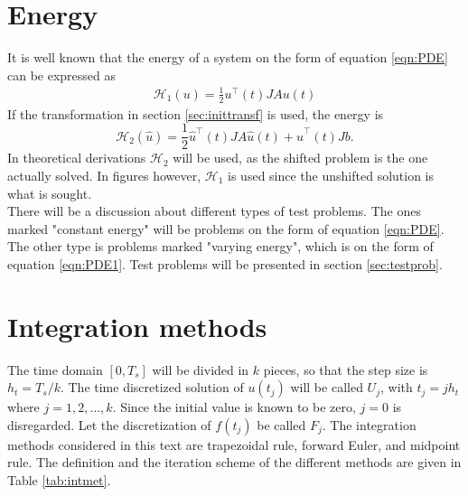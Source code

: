 \section{Energy}%
It is well known that the energy of a system on the form of equation \eqref{eqn:PDE} can be expressed as \cite{energy}
\begin{equation*}
\begin{aligned}
\mathcal{H}_1(u) = \frac{1}{2} u^\top (t) J A u(t)
\end{aligned}
\end{equation*}
\noindent If the transformation in section \ref{sec:inittransf} is used, the energy is 
\begin{equation}
\mathcal{H}_2 (\hat{u}) = \frac{1}{2} \hat{u}^\top (t)  J A \hat{u}(t) + \hat{u}^\top (t)  J b.
\label{eqn:energy2}
\end{equation}
\noindent In theoretical derivations $\mathcal{H}_2$ will be used, as the shifted problem is the one actually solved. In figures however, $\mathcal{H}_1$ is used since the unshifted solution is what is sought. \\

\noindent There will be a discussion about different types of test problems. The ones marked "constant energy" will be problems on the form of equation \eqref{eqn:PDE}. The other type is problems marked "varying energy", which is on the form of equation \eqref{eqn:PDE1}. Test problems will be presented in section \ref{sec:testprob}.

\section{Integration methods}%
\noindent The time domain $[0,T_s]$ will be divided in $k$ pieces, so that the step size is $h_t = T_s/k$. The time discretized solution of $u(t_j)$ will be called $U_j$, with $t_j = j h_t$ where $ j = 1,2,\dots,k $. Since the initial value is known to be zero, $j = 0$ is disregarded. Let the discretization of $f(t_j)$ be called $F_j$. The integration methods considered in this text are trapezoidal rule, forward Euler, and midpoint rule. The definition and the iteration scheme of the different methods are given in Table \ref{tab:intmet}. \\

